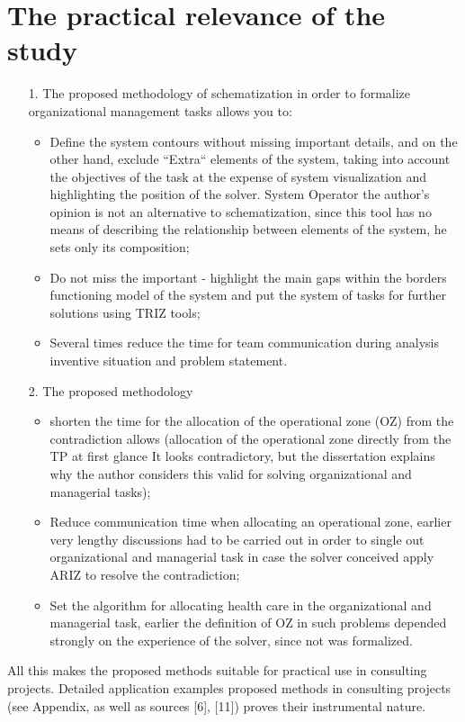 \documentclass[11pt,a4paper]{book}
\begin{document}
\section{The practical relevance of the study}
\begin{itemize}
\item [1.] The proposed methodology of schematization in order to formalize
  organizational management tasks allows you to:
  \begin{itemize}
  \item Define the system contours without missing important details, and on
    the other hand, exclude “Extra“ elements of the system, taking into
    account the objectives of the task at the expense of system visualization
    and highlighting the position of the solver. System Operator the author’s
    opinion is not an alternative to schematization, since this tool has no
    means of describing the relationship between elements of the system, he
    sets only its composition;
  \item Do not miss the important - highlight the main gaps within the borders
    functioning model of the system and put the system of tasks for further
    solutions using TRIZ tools;
  \item Several times reduce the time for team communication during analysis
    inventive situation and problem statement.
  \end{itemize}
\item [2.] The proposed methodology 
  \begin{itemize}
  \item shorten the time for the allocation of the operational zone (OZ) from
    the contradiction allows (allocation of the operational zone directly from
    the TP at first glance It looks contradictory, but the dissertation
    explains why the author considers this valid for solving organizational
    and managerial tasks);
  \item Reduce communication time when allocating an operational zone, earlier
    very lengthy discussions had to be carried out in order to single out
    organizational and managerial task in case the solver conceived apply ARIZ
    to resolve the contradiction;
  \item Set the algorithm for allocating health care in the organizational and
    managerial task, earlier the definition of OZ in such problems depended
    strongly on the experience of the solver, since not was formalized.
  \end{itemize}
\end{itemize}
All this makes the proposed methods suitable for practical use in consulting
projects.  Detailed application examples proposed methods in consulting
projects (see Appendix, as well as sources [6], [11]) proves their
instrumental nature.
\end{document}
